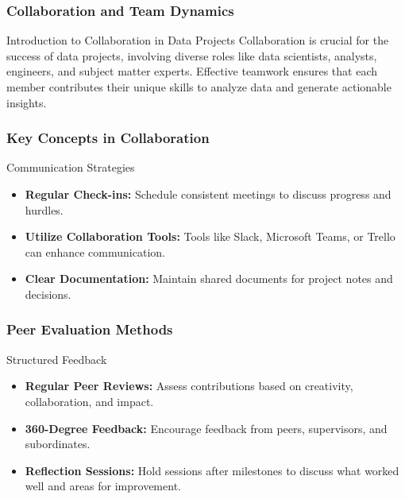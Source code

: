 \documentclass[aspectratio=169]{beamer}
\begin{document}
\begin{frame}[fragile]
    \frametitle{Collaboration and Team Dynamics}
    \begin{block}{Introduction to Collaboration in Data Projects}
        Collaboration is crucial for the success of data projects, involving diverse roles like data scientists, analysts, engineers, and subject matter experts. Effective teamwork ensures that each member contributes their unique skills to analyze data and generate actionable insights.
    \end{block}
\end{frame}

\begin{frame}[fragile]
    \frametitle{Key Concepts in Collaboration}
    \begin{block}{Communication Strategies}
        \begin{itemize}
            \item \textbf{Regular Check-ins:} Schedule consistent meetings to discuss progress and hurdles.
            \item \textbf{Utilize Collaboration Tools:} Tools like Slack, Microsoft Teams, or Trello can enhance communication.
            \item \textbf{Clear Documentation:} Maintain shared documents for project notes and decisions.
        \end{itemize}
    \end{block}
\end{frame}

\begin{frame}[fragile]
    \frametitle{Peer Evaluation Methods}
    \begin{block}{Structured Feedback}
        \begin{itemize}
            \item \textbf{Regular Peer Reviews:} Assess contributions based on creativity, collaboration, and impact.
            \item \textbf{360-Degree Feedback:} Encourage feedback from peers, supervisors, and subordinates.
            \item \textbf{Reflection Sessions:} Hold sessions after milestones to discuss what worked well and areas for improvement.
        \end{itemize}
    \end{block}
\end{frame}
\end{document}
